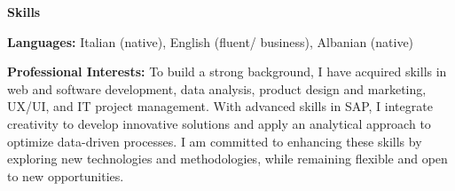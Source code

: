 \documentclass[11pt]{article}
\begin{document}
\vspace{12pt}

\begin{center}
    \textbf{Skills}
\end{center}
\textbf{Languages:} Italian (native), English (fluent/ business), Albanian (native)

\textbf{Professional Interests:} To build a strong background, I have acquired skills in web and software development, data analysis, product design and marketing, UX/UI, and IT project management. With advanced skills in SAP, I integrate creativity to develop innovative solutions and apply an analytical approach to optimize data-driven processes. I am committed to enhancing these skills by exploring new technologies and methodologies, while remaining flexible and open to new opportunities.
\end{document}
